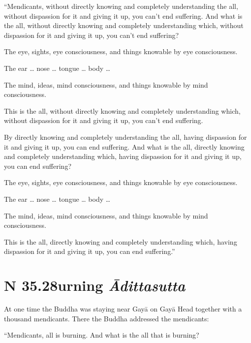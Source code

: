 \documentclass[12pt,openany]{book}%
\newcommand*{\suttatitleacronym}[1]{\smaller[2]{#1}\vspace*{.3em}}
\newcommand*{\suttatitletranslation}[1]{\linebreak{#1}}
\newcommand*{\suttatitleroot}[1]{\linebreak\smaller[2]\itshape{#1}}
\newcommand*{\tocacronym}[1]{\hspace*{-3.3em}{#1}\quad}
\newcommand*{\toctranslation}[1]{#1}
\newcommand*{\tocroot}[1]{(\textit{#1})}
\begin{document}
“Mendicants, without directly knowing and completely understanding the all, without dispassion for it and giving it up, you can’t end suffering. And what is the all, without directly knowing and completely understanding which, without dispassion for it and giving it up, you can’t end suffering? 

The eye, sights, eye consciousness, and things knowable by eye consciousness. 

The ear … nose … tongue … body … 

The mind, ideas, mind consciousness, and things knowable by mind consciousness. 

This is the all, without directly knowing and completely understanding which, without dispassion for it and giving it up, you can’t end suffering. 

By directly knowing and completely understanding the all, having dispassion for it and giving it up, you can end suffering. And what is the all, directly knowing and completely understanding which, having dispassion for it and giving it up, you can end suffering? 

The eye, sights, eye consciousness, and things knowable by eye consciousness. 

The ear … nose … tongue … body … 

The mind, ideas, mind consciousness, and things knowable by mind consciousness. 

This is the all, directly knowing and completely understanding which, having dispassion for it and giving it up, you can end suffering.” 

%
\section*{{\suttatitleacronym SN 35.28}{\suttatitletranslation Burning }{\suttatitleroot Ādittasutta}}
\addcontentsline{toc}{section}{\tocacronym{SN 35.28} \toctranslation{Burning } \tocroot{Ādittasutta}}

At one time the Buddha was staying near \textsanskrit{Gayā} on \textsanskrit{Gayā} Head together with a thousand mendicants. There the Buddha addressed the mendicants: 

“Mendicants, all is burning. And what is the all that is burning? 
\end{document}

